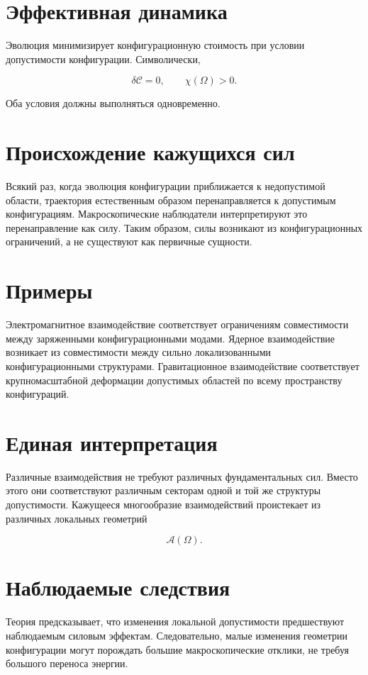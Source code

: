 \section{Эффективная динамика}

Эволюция минимизирует конфигурационную стоимость при условии допустимости конфигурации. Символически,

\[ \boxed{ \delta\mathcal C=0, \qquad \chi(\Omega)>0. } \]

Оба условия должны выполняться одновременно.

\section{Происхождение кажущихся сил}

Всякий раз, когда эволюция конфигурации приближается к недопустимой области, траектория естественным образом перенаправляется к допустимым конфигурациям. Макроскопические наблюдатели интерпретируют это перенаправление как силу. Таким образом, силы возникают из конфигурационных ограничений, а не существуют как первичные сущности.

\section{Примеры}

Электромагнитное взаимодействие соответствует ограничениям совместимости между заряженными конфигурационными модами. Ядерное взаимодействие возникает из совместимости между сильно локализованными конфигурационными структурами. Гравитационное взаимодействие соответствует крупномасштабной деформации допустимых областей по всему пространству конфигураций.

\section{Единая интерпретация}

Различные взаимодействия не требуют различных фундаментальных сил. Вместо этого они соответствуют различным секторам одной и той же структуры допустимости. Кажущееся многообразие взаимодействий проистекает из различных локальных геометрий

\[ \mathcal A(\Omega). \]

\section{Наблюдаемые следствия}

Теория предсказывает, что изменения локальной допустимости предшествуют наблюдаемым силовым эффектам. Следовательно, малые изменения геометрии конфигурации могут порождать большие макроскопические отклики, не требуя большого переноса энергии.


